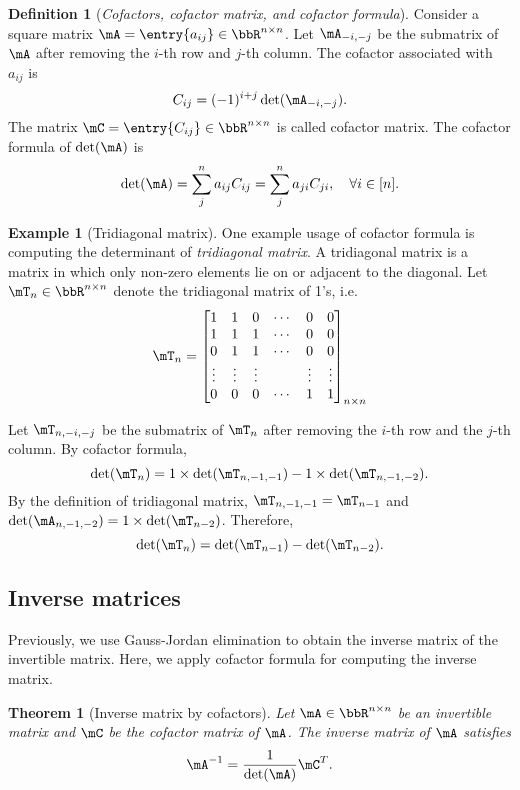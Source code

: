 \documentclass[11pt]{article}
\theoremstyle{plain}
\newtheorem{thm}{Theorem}[section]
\theoremstyle{definition}
\newtheorem{defn}{Definition}
\newtheorem{example}{Example}
\begin{document}
\begin{defn}[\textit{Cofactors, cofactor matrix, and cofactor formula}]
	Consider a square matrix $\mA=  \entry{a_{ij}} \in \bbR^{n \times n}$. Let $\mA_{-i,-j}$ be the submatrix of $\mA$ after removing the $i$-th row and $j$-th column. The cofactor associated with $a_{ij}$ is \[C_{ij} = (-1)^{i+j}\det(\mA_{-i,-j}).\]
	The matrix $\mC = \entry{C_{ij}} \in \bbR^{n \times n}$ is called cofactor matrix.  The cofactor formula of $\det(\mA)$ is 
	\[ \det(\mA) = \sum_{j}^n a_{ij} C_{ij} = \sum_{j}^n a_{ji} C_{ji} ,\quad \forall i \in [n].  \]
\end{defn}

\begin{example}[Tridiagonal matrix]
	One example usage of cofactor formula is computing the determinant of \textit{tridiagonal matrix}. A tridiagonal matrix is a matrix in which only non-zero elements lie on or adjacent to the diagonal. Let $\mT_n \in \bbR^{n \times n}$ denote the tridiagonal matrix of 1's, i.e.\
\begin{align}
	\mT_n = \begin{bmatrix}
		1 &1&0 &\cdots & 0 &0\\
		1&1&1&\cdots &0&0\\
		0&1&1&\cdots &0&0\\
		\vdots &\vdots &\vdots &&\vdots &\vdots \\
		0&0&0&\cdots&1&1
	\end{bmatrix}_{n \times n}
\end{align} 

Let $\mT_{n, -i,-j}$ be the submatrix of  $\mT_n$ after removing the $i$-th row and the $j$-th column.   By cofactor formula, 
\[  \det(\mT_n) = 1 \times \det(\mT_{n, -1,-1}) - 1 \times \det(\mT_{n,-1,-2}). \]
By the definition of tridiagonal matrix, $\mT_{n,-1,-1} = \mT_{n-1}$ and $\det( \mA_{n,-1,-2}) = 1 \times \det(\mT_{n-2}) $. Therefore, 
\[ \det(\mT_n) = \det(\mT_{n-1}) - \det(\mT_{n-2}).  \] 
\end{example}

\subsection{Inverse matrices}
Previously, we use Gauss-Jordan elimination to obtain the inverse matrix of the invertible matrix. Here, we apply cofactor formula for computing the inverse matrix.

\begin{thm}[Inverse matrix by cofactors]\label{thm:inver}
Let $\mA \in \bbR^{n \times n}$ be an invertible matrix and $\mC$ be the cofactor matrix of $\mA$. The inverse matrix of $\mA$ satisfies
\[  \mA^{-1} = \frac{1}{\det(\mA)} \mC^T. \]	
\end{thm}
\end{document}

